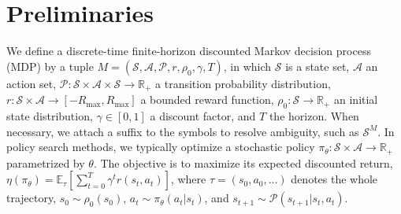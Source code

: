 \documentclass{article} %
\renewcommand{\S}{\mathcal{S}}
\newcommand{\A}{\mathcal{A}}
\newcommand{\EE}{\mathbb{E}}
\newcommand{\sset}{\mathcal{S}}
\newcommand{\aset}{\mathcal{A}}
\newcommand{\trans}{\mathcal{P}}
\begin{document}
\section{Preliminaries}
    
    
    We define a discrete-time finite-horizon discounted Markov decision process (MDP) by a tuple $M = (\sset, \aset, \trans, r, \rho_0, \gamma, T)$, in which $\sset$ is a state set, $\aset$ an action set, $\trans: \sset \times \aset \times \sset \rightarrow \mathbb{R}_{+}$ a transition probability distribution, $r: \sset \times \aset \rightarrow [-R_{\max}, R_{\max}]$ a bounded reward function, $\rho_0: \sset \to \mathbb{R}_+$ an initial state distribution, $\gamma \in [0, 1]$ a discount factor, and $T$ the horizon. When necessary, we attach a suffix to the symbols to resolve ambiguity, such as $\sset^M$. In policy search methods, we typically optimize a stochastic policy $\pi_{\theta}: \sset \times \aset \to \mathbb{R}_+$ parametrized by $\theta$. The objective is to maximize its expected discounted return, $ \eta(\pi_\theta) = \mathbb{E}_{\tau}[ \sum_{t=0}^T \gamma^t r(s_t, a_t) ]$, where $\tau = (s_0, a_0, \ldots)$ denotes the whole trajectory, $\displaystyle s_0 \sim \rho_0(s_0)$, $a_t \sim \pi_\theta(a_t|s_t)$, and $s_{t+1} \sim \trans(s_{t+1} | s_t, a_t)$.

\end{document}

